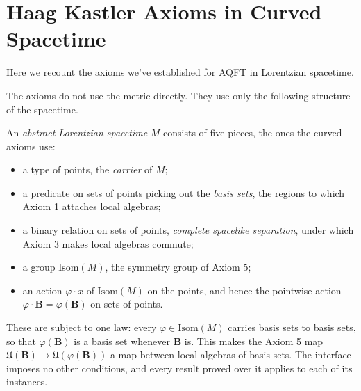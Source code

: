 \section{Haag Kastler Axioms in Curved Spacetime}\label{sctn:haag-kastler-axioms-in-curved-spacetime}
Here we recount the axioms we've established for AQFT in Lorentzian spacetime.

The axioms do not use the metric directly. They use only the following structure of the spacetime.

\begin{definition}
    \label{def:abstract-lorentzian-spacetime-interface}
    \leanok
    An \emph{abstract Lorentzian spacetime} $M$ consists of five pieces, the ones the curved axioms use:
    \begin{itemize}
        \item[(i)] a type of points, the \emph{carrier} of $M$;
        \item[(ii)] a predicate on sets of points picking out the \emph{basis sets}, the regions to which Axiom 1 attaches local algebras;
        \item[(iii)] a binary relation on sets of points, \emph{complete spacelike separation}, under which Axiom 3 makes local algebras commute;
        \item[(iv)] a group $\mathrm{Isom}(M)$, the symmetry group of Axiom 5;
        \item[(v)] an action $\varphi \cdot x$ of $\mathrm{Isom}(M)$ on the points, and hence the pointwise action $\varphi \cdot \mathbf{B} = \varphi(\mathbf{B})$ on sets of points.
    \end{itemize}
    These are subject to one law: every $\varphi \in \mathrm{Isom}(M)$ carries basis sets to basis sets, so that $\varphi(\mathbf{B})$ is a basis set whenever $\mathbf{B}$ is. This makes the Axiom 5 map $\mathfrak{U}(\mathbf{B}) \to \mathfrak{U}(\varphi(\mathbf{B}))$ a map between local algebras of basis sets. The interface imposes no other conditions, and every result proved over it applies to each of its instances.


\end{definition}
